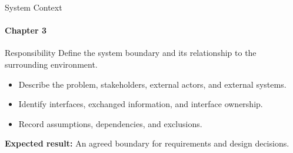 \begin{frame}{System Context}
\framesubtitle{Chapter 3}
\begin{block}{Responsibility}
Define the system boundary and its relationship to the surrounding environment.
\end{block}
\begin{itemize}
  \item Describe the problem, stakeholders, external actors, and external systems.
  \item Identify interfaces, exchanged information, and interface ownership.
  \item Record assumptions, dependencies, and exclusions.
\end{itemize}
\vspace{0.15cm}
\textbf{Expected result:} An agreed boundary for requirements and design decisions.
\end{frame}
